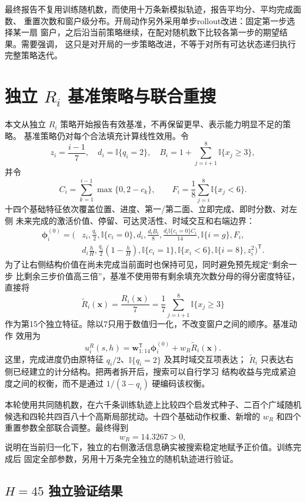 \documentclass[UTF8,11pt,openany]{ctexrep}
\newcommand{\ind}{\mathbb{I}}
\newcommand{\xvec}{\boldsymbol{x}}
\begin{document}
最终报告不复用训练随机数，而使用十万条新模拟轨迹，报告平均分、平均完成面数、
重置次数和窗户级分布。开局动作另外采用单步rollout改进：固定第一步选择某一扇
窗户，之后沿当前策略继续，在配对随机数下比较各第一步的期望结果。需要强调，
这只是对开局的一步策略改进，不等于对所有可达状态递归执行完整策略迭代。

\section{独立 \texorpdfstring{$R_i$}{Ri} 基准策略与联合重搜}

本文从独立 $R_i$ 策略开始报告有效基准，不再保留更早、表示能力明显不足的策略。
基准策略仍对每个合法填充计算线性效用。令
\[
z_i=\frac{i-1}{7},\quad d_i=\ind\{q_i=2\},\quad
B_i=1+\sum_{j=i+1}^{8}\ind\{x_j\ge3\},
\]
并令
\[
C_i=\sum_{k=1}^{i-1}\max\{0,2-c_k\},\qquad
F_i=\frac{1}{8}\sum_{j=i}^{8}\ind\{x_j<6\}.
\]
十四个基础特征依次覆盖位置、进度、第一/第二面、立即完成、即时分数、对左侧
未来完成的激活价值、停留、可达灵活性、时域交互和右端边界：
\[
\begin{aligned}
\boldsymbol\phi^{(0)}_i=\bigg(&z_i,\frac{q_i}{2},\ind\{c_i=0\},d_i,
\frac{d_iB_i}{8},\frac{d_i\ind\{c_i=0\}C_i}{14},
\ind\{i=g\},F_i,\\
&d_i\frac{h}{H},\frac{q_i}{2}\left(1-\frac{h}{H}\right),
\ind\{c_i=1\},\ind\{x_i<6\},\ind\{i=8\},z_i^2\bigg)^{\mathsf T}.
\end{aligned}
\]
为了让右侧结构价值在尚未完成当前面时也保持可见，同时避免预先规定“剩余一步
比剩余三步价值高三倍”，基准不使用带有剩余填充次数分母的得分密度特征，直接将
\[
\widetilde R_i(\xvec)
=\frac{R_i(\xvec)}{7}
=\frac{1}{7}\sum_{j=i+1}^{8}\ind\{x_j\ge3\}
\]
作为第15个独立特征。除以7只用于数值归一化，不改变窗户之间的顺序。基准动作
效用为
\[
u_i^{R}(s,h)
=\boldsymbol{w}_{1:14}^{\mathsf T}\boldsymbol{\phi}^{(0)}_i
+w_R\widetilde R_i(\xvec).
\]
这里，完成进度仍由原特征 $q_i/2$、$\ind\{q_i=2\}$ 及其时域交互项表达；
$\widetilde R_i$ 只表达右侧已经建立的计分结构。把两者拆开后，搜索可以自行学习
结构收益与完成紧迫度之间的权衡，而不是通过 $1/(3-q_i)$ 硬编码该权衡。

本轮使用共同随机数，在六千条训练轨迹上比较四个启发式种子、二百个广域随机
候选和四轮共四百八十个高斯局部扰动。十四个基础动作权重、新增的 $w_R$ 和四个
重置参数全部联合调整。最终得到
\[
w_R=14.3267>0,
\]
说明在当前归一化下，独立的右侧激活信息确实被搜索稳定地赋予正价值。训练完成后
固定全部参数，另用十万条完全独立的随机轨迹进行验证。

\subsection{\texorpdfstring{$H=45$}{H=45} 独立验证结果}
\end{document}
